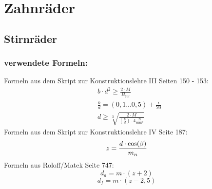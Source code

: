 \section{Zahnräder}
\subsection{Stirnräder}
\subsubsection{verwendete Formeln:}
Formeln aus dem Skript zur Konstruktionslehre III Seiten 150 - 153:
\begin{align*}
	&b \cdot d^2 \ge\frac{2 \cdot M}{B_{zul}} \\
	&\frac{b}{d} = (0,1...0,5) + \frac{i}{20} \\
	&d \ge \sqrt[3]{\frac{2 \cdot M}{( \frac{b}{d}) \cdot  4 \frac{\text{N}}{\text{mm}^2}}}
\end{align*}
Formeln aus dem Skript zur Konstruktionslehre IV Seite 187:
\begin{align*}
	&z= \frac{d \cdot \cos(\beta)}{m_n} \\
\end{align*}
Formeln aus Roloff/Matek Seite 747:
\[
	d_a = m \cdot (z+2)
\]
\[
	d_f = m \cdot (z-2,5)
\]
